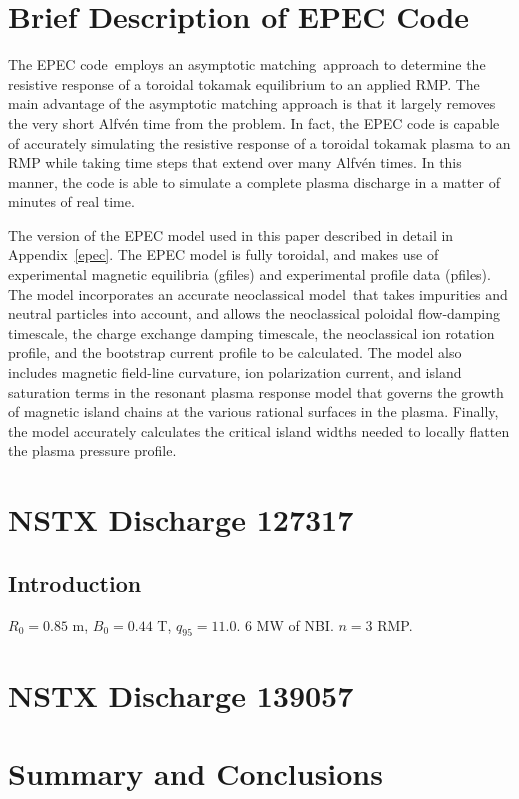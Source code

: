 \documentclass[12pt,prb,aps]{revtex4-1}
\begin{document}
\section{Brief Description of EPEC Code}\label{epecc}
The EPEC code\,\cite{rftor,rftor1,rftor2,rftor3} employs an asymptotic matching\,\cite{fkr,coppi,ruth,ara,tt1,tt2,tt3,tt4,tt5,tt6,tt7} approach to determine the resistive response of a toroidal tokamak equilibrium to an applied RMP.
The main advantage of the asymptotic matching approach is that it largely removes the very short Alfv\'{e}n time from the problem. In fact, the EPEC
code is capable of accurately simulating the resistive response of a toroidal tokamak plasma to an RMP while taking time steps that extend over many Alfv\'{e}n times. 
In this manner, the code is able to simulate a complete plasma discharge in a matter of minutes of real time. 

The version of the EPEC model used in this paper described in detail in Appendix~\ref{epec}. 
The EPEC model is fully toroidal, and makes use of experimental magnetic equilibria (gfiles)  and experimental profile data (pfiles). The model incorporates an accurate neoclassical model\,\cite{sigmar} that takes impurities and neutral particles into account, and  allows the neoclassical poloidal flow-damping timescale, the charge exchange damping timescale, the neoclassical ion rotation profile, and the bootstrap current profile to be calculated. The model also includes  magnetic field-line curvature, ion polarization current, and island saturation terms in the resonant plasma response model that governs the growth of magnetic island chains at the various rational surfaces in the plasma. Finally, the model accurately calculates the critical
island widths needed to locally flatten the plasma pressure profile. 

\section{NSTX Discharge 127317}
\subsection{Introduction}
$R_0=0.85$ m, $B_0=0.44$ T, $q_{95} = 11.0$. $6$ MW of NBI. $n=3$ RMP. 

\section{NSTX Discharge 139057}

\section{Summary and Conclusions}
\end{document}
